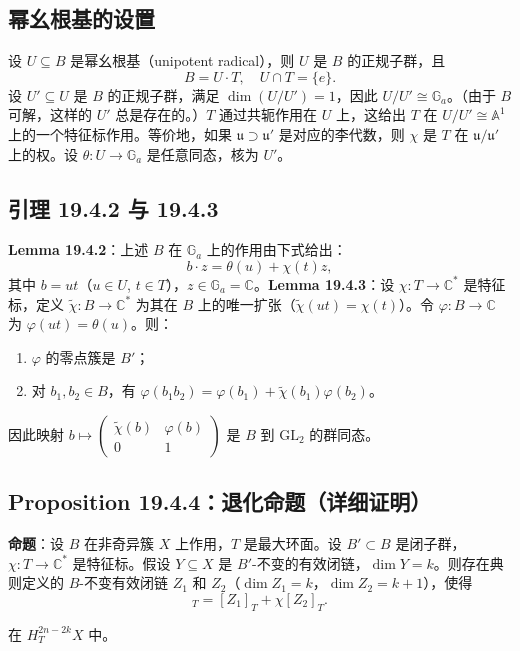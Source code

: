 \subsection{幂幺根基的设置}设 $U \subseteq B$ 是幂幺根基（unipotent radical），则 $U$ 是 $B$ 的正规子群，且\[B = U \cdot T, \quad U \cap T = \{e\}.\]设 $U' \subseteq U$ 是 $B$ 的正规子群，满足 $\dim(U/U') = 1$，因此 $U/U' \cong \mathbb{G}_a$。（由于 $B$ 可解，这样的 $U'$ 总是存在的。）$T$ 通过共轭作用在 $U$ 上，这给出 $T$ 在 $U/U' \cong \mathbb{A}^1$ 上的一个特征标作用。等价地，如果 $\mathfrak{u} \supset \mathfrak{u}'$ 是对应的李代数，则 $\chi$ 是 $T$ 在 $\mathfrak{u}/\mathfrak{u}'$ 上的权。设 $\theta: U \to \mathbb{G}_a$ 是任意同态，核为 $U'$。
\subsection{引理 19.4.2 与 19.4.3}\textbf{Lemma 19.4.2}：上述 $B$ 在 $\mathbb{G}_a$ 上的作用由下式给出：\[b \cdot z = \theta(u) + \chi(t)z,\]其中 $b = ut$（$u \in U$, $t \in T$），$z \in \mathbb{G}_a = \mathbb{C}$。\textbf{Lemma 19.4.3}：设 $\chi: T \to \mathbb{C}^*$ 是特征标，定义 $\tilde{\chi}: B \to \mathbb{C}^*$ 为其在 $B$ 上的唯一扩张（$\tilde{\chi}(ut) = \chi(t)$）。令 $\varphi: B \to \mathbb{C}$ 为 $\varphi(ut) = \theta(u)$。则：
\begin{enumerate}
\item $\varphi$ 的零点簇是 $B'$；\item 对 $b_1, b_2 \in B$，有 $\varphi(b_1 b_2) = \varphi(b_1) + \tilde{\chi}(b_1)\varphi(b_2)$。
\end{enumerate}因此映射 $b \mapsto 
\begin{pmatrix} \tilde{\chi}(b) & \varphi(b) \\ 0 & 1 
\end{pmatrix}$ 是 $B$ 到 $\mathrm{GL}_2$ 的群同态。
\subsection{Proposition 19.4.4：退化命题（详细证明）}\textbf{命题}：设 $B$ 在非奇异簇 $X$ 上作用，$T$ 是最大环面。设 $B' \subset B$ 是闭子群，$\chi: T \to \mathbb{C}^*$ 是特征标。假设 $Y \subseteq X$ 是 $B'$-不变的有效闭链，$\dim Y = k$。则存在典则定义的 $B$-不变有效闭链 $Z_1$ 和 $Z_2$（$\dim Z_1 = k$，$\dim Z_2 = k+1$），使得
\begin{equation}[Y]_T = [Z_1]_T + \chi [Z_2]_T.
\label{eq:DegenerationProp}
\end{equation}

在 $H_T^{2n-2k}X$ 中。

